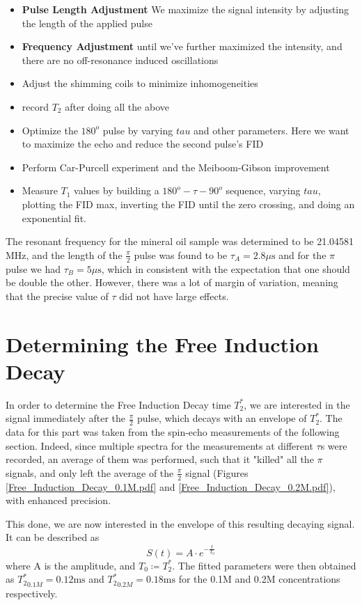 \documentclass[12pt]{article}
\begin{document}
\begin{itemize}
    \item \textbf{Pulse Length Adjustment} We maximize the signal intensity by adjusting the length of the applied pulse
    \item \textbf{Frequency Adjustment} until we've further maximized the intensity, and there are no off-resonance induced oscillations
    \item Adjust the shimming coils to minimize inhomogeneities
    \item record $T_2$ after doing all the above
    \item Optimize the $180^o$ pulse by varying $tau$ and other parameters. Here we want to maximize the echo and reduce the second pulse's FID
    \item Perform Car-Purcell experiment and the Meiboom-Gibson improvement
    \item Measure $T_1$ values by building a $180^o - \tau - 90^o$ sequence, varying $tau$, plotting the FID max, inverting the FID until the zero crossing, and doing an exponential fit.

\end{itemize}

The resonant frequency for the mineral oil sample was determined to be 21.04581 MHz, and the length of the $\frac{\pi}{2}$ pulse was found to be $\tau_{A} = 2.8 \text{$\mu$s}$ and for the $\pi$ pulse we had $\tau_{B} = 5 \text{$\mu$s}$, which in consistent with the expectation that one should be double the other. However, there was a lot of margin of variation, meaning that the precise value of $\tau$ did not have large effects.

\section{Determining the Free Induction Decay}
In order to determine the Free Induction Decay time $T_2^*$, we are interested in the signal immediately after the $\frac{\pi}{2}$ pulse, which decays with an envelope of $T_2^*$. The data for this part was taken from the spin-echo measurements of the following section. Indeed, since multiple spectra for the measurements at different $\tau$s were recorded, an average of them was performed, such that it "killed" all the $\pi$ signals, and only left the average of the $\frac{\pi}{2}$ signal (Figures \ref{Free_Induction_Decay_0.1M.pdf} and \ref{Free_Induction_Decay_0.2M.pdf}), with enhanced precision.

This done, we are now interested in the envelope of this resulting decaying signal. It can be described as  \[
	S(t) = A \cdot e^{-\frac{t}{T_0}}
\]
where A is the amplitude, and $T_0 \coloneq T_2^*$. The fitted parameters were then obtained as ${T_2^*}_{0.1M} = 0.12 \text{ms}$ and ${T_2^*}_{0.2M} = 0.18 \text{ms}$ for the 0.1M and 0.2M concentrations respectively.
\end{document}
